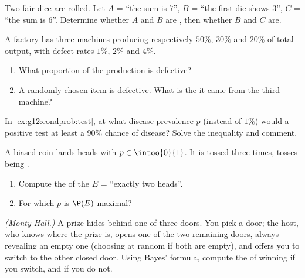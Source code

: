\begin{exercise}[$\star$]\label{exo:g12:condprob:3}
Two fair dice are rolled. Let $A$ = ``the sum is $7$'', $B$ = ``the first
die shows $3$'', $C$ = ``the sum is $6$''. Determine whether $A$ and $B$
are , then whether $B$ and $C$ are.
\end{exercise}

\begin{exercise}[$\star\star$]\label{exo:g12:condprob:4}
A factory has three machines producing respectively $50\%$, $30\%$ and
$20\%$ of total output, with defect rates $1\%$, $2\%$ and $4\%$.
\begin{enumerate}
  \item What proportion of the production is defective?
  \item A randomly chosen item is defective. What is the  it
        came from the third machine?
\end{enumerate}
\end{exercise}

\begin{exercise}[$\star\star$]\label{exo:g12:condprob:5}
In \cref{ex:g12:condprob:test}, at what disease prevalence $p$ (instead of
$1\%$) would a positive test  at least a $90\%$ chance of disease? Solve
the inequality and comment.
\end{exercise}

\begin{exercise}[$\star\star$]\label{exo:g12:condprob:6}
A biased coin lands heads with  $p \in \intoo{0}{1}$. It is
tossed three times, tosses being .
\begin{enumerate}
  \item Compute the  of the  $E$ = ``exactly two heads''.
  \item For which $p$ is $\P(E)$ maximal?
\end{enumerate}
\end{exercise}

\begin{exercise}[$\star\star\star$]\label{exo:g12:condprob:7}
\emph{(Monty Hall.)} A prize hides behind one of three doors. You pick a
door; the host, who knows where the prize is, opens one of the two
remaining doors, always revealing an empty one (choosing at random if both
are empty), and offers you to switch to the other closed door. Using
Bayes' formula, compute the  of winning if you switch, and if
you do not.
\end{exercise}

